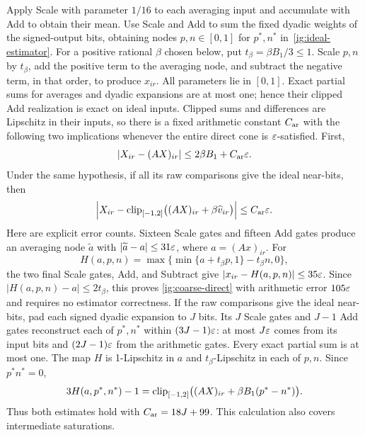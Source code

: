 Apply Scale with parameter $1/16$ to each averaging input and accumulate
with Add to obtain their mean. Use Scale and Add to sum the fixed dyadic
weights of the signed-output bits, obtaining nodes $p,n\in[0,1]$ for
$p^*,n^*$ in~\eqref{ig:ideal-estimator}. For a positive rational $\beta$
chosen below, put $t_\beta=\beta B_1/3\le1$. Scale $p,n$ by
$t_\beta$, add the positive term to the averaging node, and subtract
the negative term, in that order, to produce $x_{ir}$. All parameters
lie in $[0,1]$. Exact partial sums for averages and dyadic expansions
are at most one; hence their clipped Add realization is exact on ideal
inputs. Clipped sums and differences are Lipschitz in their inputs, so
there is a fixed arithmetic constant $C_{\rm ar}$ with the following
two implications whenever the entire direct cone is $\varepsilon$-satisfied.
First,
\begin{equation}
 |X_{ir}-(AX)_{ir}|
   \le2\beta B_1+C_{\rm ar}\varepsilon.
       \label{ig:coarse-direct}
\end{equation}
Under the same hypothesis, if all its raw comparisons give the ideal
near-bits, then
\begin{equation}
 \left|X_{ir}-\operatorname{clip}_{[-1,2]}
       \bigl((AX)_{ir}+\beta\widehat v_{ir}\bigr)\right|
   \le C_{\rm ar}\varepsilon.
       \label{ig:fine-direct}
\end{equation}
Here are explicit error counts. Sixteen Scale gates and fifteen Add
gates produce an averaging node $\widetilde a$ with
$|\widetilde a-a|\le31\varepsilon$, where $a=(Ax)_{ir}$.
For
\[
 H(a,p,n)=\max\{\min\{a+t_\beta p,1\}-t_\beta n,0\},
\]
the two final Scale gates, Add, and Subtract give
$|x_{ir}-H(a,p,n)|\le35\varepsilon$. Since
$|H(a,p,n)-a|\le2t_\beta$, this proves
\eqref{ig:coarse-direct} with arithmetic error $105\varepsilon$ and requires
no estimator correctness. If the raw comparisons give the ideal near-bits,
pad each signed dyadic expansion to $J$ bits. Its $J$ Scale gates and
$J-1$ Add gates reconstruct each of $p^*,n^*$ within
$(3J-1)\varepsilon$: at most $J\varepsilon$ comes from its input bits and
$(2J-1)\varepsilon$ from the arithmetic gates. Every exact partial sum is
at most one. The map $H$ is 1-Lipschitz in $a$ and $t_\beta$-Lipschitz
in each of $p,n$. Since $p^*n^*=0$,
\[
 3H(a,p^*,n^*)-1
   =\operatorname{clip}_{[-1,2]}\bigl((AX)_{ir}
                         +\beta B_1(p^*-n^*)\bigr).
\]
Thus both estimates hold with $C_{\rm ar}=18J+99$. This calculation
also covers intermediate saturations.

